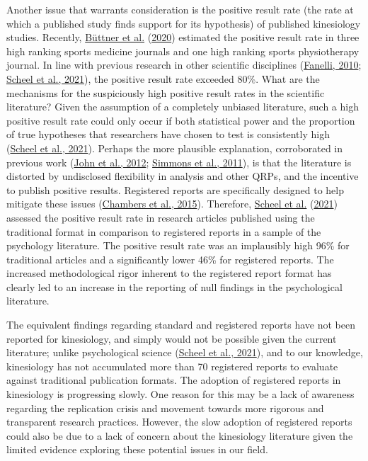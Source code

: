 \documentclass[]{cik}%
\begin{document}
Another issue that warrants consideration is the positive result rate
(the rate at which a published study finds support for its hypothesis)
of published kinesiology studies. Recently,
\protect\hyperlink{ref-buttner_2020}{Büttner et al.}
(\protect\hyperlink{ref-buttner_2020}{2020}) estimated the positive
result rate in three high ranking sports medicine journals and one high
ranking sports physiotherapy journal. In line with previous research in
other scientific disciplines
(\protect\hyperlink{ref-fanelli_positive_2010}{Fanelli, 2010};
\protect\hyperlink{ref-scheel_excess_2020}{Scheel et al., 2021}), the
positive result rate exceeded 80\%. What are the mechanisms for the
suspiciously high positive result rates in the scientific literature?
Given the assumption of a completely unbiased literature, such a high
positive result rate could only occur if both statistical power and the
proportion of true hypotheses that researchers have chosen to test is
consistently high (\protect\hyperlink{ref-scheel_excess_2020}{Scheel et
al., 2021}). Perhaps the more plausible explanation, corroborated in
previous work (\protect\hyperlink{ref-John_Loewenstein_Prelec_2012}{John
et al., 2012};
\protect\hyperlink{ref-simmons_false-positive_2011}{Simmons et al.,
2011}), is that the literature is distorted by undisclosed flexibility
in analysis and other QRPs, and the incentive to publish positive
results. Registered reports are specifically designed to help mitigate
these issues (\protect\hyperlink{ref-chambers_registered_2015}{Chambers
et al., 2015}). Therefore,
\protect\hyperlink{ref-scheel_excess_2020}{Scheel et al.}
(\protect\hyperlink{ref-scheel_excess_2020}{2021}) assessed the positive
result rate in research articles published using the traditional format
in comparison to registered reports in a sample of the psychology
literature. The positive result rate was an implausibly high 96\% for
traditional articles and a significantly lower 46\% for registered
reports. The increased methodological rigor inherent to the registered
report format has clearly led to an increase in the reporting of null
findings in the psychological literature.

The equivalent findings regarding standard and registered reports have
not been reported for kinesiology, and simply would not be possible
given the current literature; unlike psychological science
(\protect\hyperlink{ref-scheel_excess_2020}{Scheel et al., 2021}), and
to our knowledge, kinesiology has not accumulated more than 70
registered reports to evaluate against traditional publication formats.
The adoption of registered reports in kinesiology is progressing slowly.
One reason for this may be a lack of awareness regarding the replication
crisis and movement towards more rigorous and transparent research
practices. However, the slow adoption of registered reports could also
be due to a lack of concern about the kinesiology literature given the
limited evidence exploring these potential issues in our field.
\end{document}
